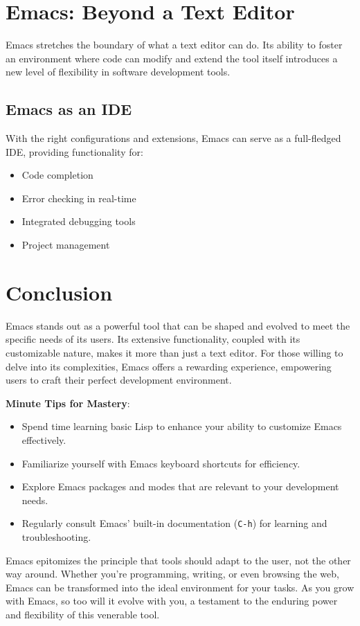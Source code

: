 \documentclass{article}
\begin{document}
\section{Emacs: Beyond a Text Editor}

Emacs stretches the boundary of what a text editor can do. Its ability to foster an environment where code can modify and extend the tool itself introduces a new level of flexibility in software development tools.

\subsection{Emacs as an IDE}

With the right configurations and extensions, Emacs can serve as a full-fledged IDE, providing functionality for:

\begin{itemize}
    \item Code completion
    \item Error checking in real-time
    \item Integrated debugging tools
    \item Project management
\end{itemize}

\section{Conclusion}

Emacs stands out as a powerful tool that can be shaped and evolved to meet the specific needs of its users. Its extensive functionality, coupled with its customizable nature, makes it more than just a text editor. For those willing to delve into its complexities, Emacs offers a rewarding experience, empowering users to craft their perfect development environment.

\textbf{Minute Tips for Mastery}:

\begin{itemize}
    \item Spend time learning basic Lisp to enhance your ability to customize Emacs effectively.
    \item Familiarize yourself with Emacs keyboard shortcuts for efficiency.
    \item Explore Emacs packages and modes that are relevant to your development needs.
    \item Regularly consult Emacs' built-in documentation (\texttt{C-h}) for learning and troubleshooting.
\end{itemize}

Emacs epitomizes the principle that tools should adapt to the user, not the other way around. Whether you're programming, writing, or even browsing the web, Emacs can be transformed into the ideal environment for your tasks. As you grow with Emacs, so too will it evolve with you, a testament to the enduring power and flexibility of this venerable tool.
\end{document}
